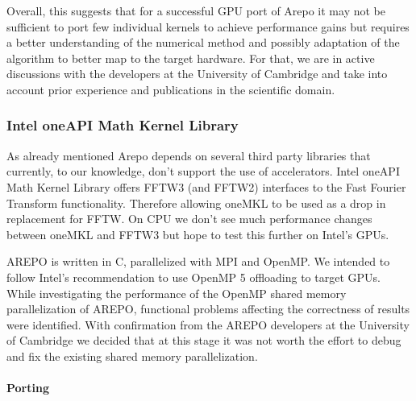 \documentclass[../main]{subfiles}
\begin{document}
Overall, this suggests that for a successful GPU port of Arepo it may not be sufficient to port few individual kernels to achieve performance gains but requires a better understanding of the numerical method and possibly adaptation of the algorithm to better map to the target hardware.
For that, we are in active discussions with the developers at the University of Cambridge and take into account prior experience and publications in the scientific domain.

\subsubsection{Intel oneAPI Math Kernel Library}
As already mentioned Arepo depends on several third party libraries that currently, to our knowledge, don't support the use of accelerators. Intel oneAPI Math Kernel Library offers FFTW3 (and FFTW2) interfaces to the Fast Fourier Transform functionality. Therefore allowing oneMKL to be used as a drop in replacement for FFTW. On CPU we don't see much performance changes between oneMKL and FFTW3 but hope to test this further on Intel's GPUs. 

AREPO is written in C, parallelized with MPI and OpenMP. We intended to follow Intel’s recommendation to use OpenMP 5 offloading to target GPUs. While investigating the performance of the OpenMP shared memory parallelization of AREPO, functional problems affecting the correctness of results were identified. With confirmation from the AREPO developers at the University of Cambridge we decided that at this stage it was not worth the effort to debug and fix the existing shared memory parallelization. 
\paragraph{Porting}



\end{document}
